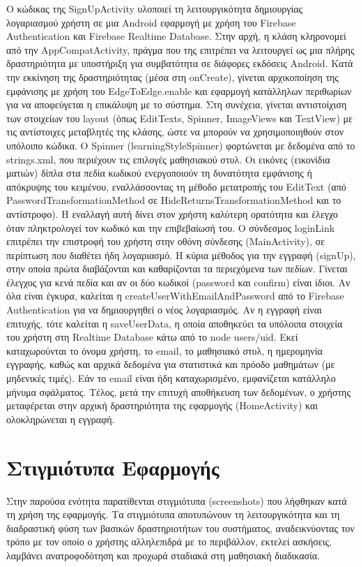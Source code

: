 \documentclass[11pt]{report}
\begin{document}
Ο κώδικας της SignUpActivity υλοποιεί τη λειτουργικότητα δημιουργίας λογαριασμού χρήστη σε μια Android εφαρμογή με χρήση του Firebase Authentication και Firebase Realtime Database. Στην αρχή, η κλάση κληρονομεί από την AppCompatActivity, πράγμα που της επιτρέπει να λειτουργεί ως μια πλήρης δραστηριότητα με υποστήριξη για συμβατότητα σε διάφορες εκδόσεις Android. Κατά την εκκίνηση της δραστηριότητας (μέσα στη onCreate), γίνεται αρχικοποίηση της εμφάνισης με χρήση του EdgeToEdge.enable και εφαρμογή κατάλληλων περιθωρίων για να αποφεύγεται η επικάλυψη με το σύστημα. Στη συνέχεια, γίνεται αντιστοίχιση των στοιχείων του layout (όπως EditTexts, Spinner, ImageViews και TextView) με τις αντίστοιχες μεταβλητές της κλάσης, ώστε να μπορούν να χρησιμοποιηθούν στον υπόλοιπο κώδικα.
Ο Spinner (learningStyleSpinner) φορτώνεται με δεδομένα από το strings.xml, που περιέχουν τις επιλογές μαθησιακού στυλ. Οι εικόνες (εικονίδια ματιών) δίπλα στα πεδία κωδικού ενεργοποιούν τη δυνατότητα εμφάνισης ή απόκρυψης του κειμένου, εναλλάσσοντας τη μέθοδο μετατροπής του EditText (από PasswordTransformationMethod σε HideReturnsTransformationMethod και το αντίστροφο). Η εναλλαγή αυτή δίνει στον χρήστη καλύτερη ορατότητα και έλεγχο όταν πληκτρολογεί τον κωδικό και την επιβεβαίωσή του.
Ο σύνδεσμος loginLink επιτρέπει την επιστροφή του χρήστη στην οθόνη σύνδεσης (MainActivity), σε περίπτωση που διαθέτει ήδη λογαριασμό. Η κύρια μέθοδος για την εγγραφή (signUp), στην οποία πρώτα διαβάζονται και καθαρίζονται τα περιεχόμενα των πεδίων. Γίνεται έλεγχος για κενά πεδία και αν οι δύο κωδικοί (password και confirm) είναι ίδιοι. Αν όλα είναι έγκυρα, καλείται η createUserWithEmailAndPassword από το Firebase Authentication για να δημιουργηθεί ο νέος λογαριασμός.
Αν η εγγραφή είναι επιτυχής, τότε καλείται η saveUserData, η οποία αποθηκεύει τα υπόλοιπα στοιχεία του χρήστη στη Realtime Database κάτω από το node users/{uid}. Εκεί καταχωρούνται το όνομα χρήστη, το email, το μαθησιακό στυλ, η ημερομηνία εγγραφής, καθώς και αρχικά δεδομένα για στατιστικά και πρόοδο μαθημάτων (με μηδενικές τιμές). Εάν το email είναι ήδη καταχωρισμένο, εμφανίζεται κατάλληλο μήνυμα σφάλματος. Τέλος, μετά την επιτυχή αποθήκευση των δεδομένων, ο χρήστης μεταφέρεται στην αρχική δραστηριότητα της εφαρμογής (HomeActivity) και ολοκληρώνεται η εγγραφή.

\section{Στιγμιότυπα Εφαρμογής}

Στην παρούσα ενότητα παρατίθενται στιγμιότυπα (screenshots) που λήφθηκαν κατά τη χρήση της εφαρμογής. Τα στιγμιότυπα αποτυπώνουν τη λειτουργικότητα και τη διαδραστική φύση των βασικών δραστηριοτήτων του συστήματος, αναδεικνύοντας τον τρόπο με τον οποίο ο χρήστης αλληλεπιδρά με το περιβάλλον, εκτελεί ασκήσεις, λαμβάνει ανατροφοδότηση και προχωρά σταδιακά στη μαθησιακή διαδικασία.
\end{document}
